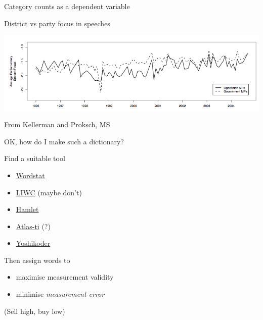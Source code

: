 \documentclass{hertieteaching}
\begin{document}
\begin{frame}{Category counts as a dependent variable}

District vs party focus in speeches

{\centering \includegraphics[width=0.9\linewidth]{pictures/district-party-focus} 

}
From Kellerman and Proksch, MS


\end{frame}

%
%
%
%

\begin{frame}{OK, how do I make such a dictionary?}

Find a suitable tool
\begin{itemize}
  \item \href{http://provalisresearch.com/products/content-analysis-software/}{Wordstat}
  \item \href{http://liwc.wpengine.com/}{LIWC} (maybe don't)
  \item \href{http://apb.newmdsx.com/hamlet2.html}{Hamlet}
  \item \href{http://atlasti.com/}{Atlas-ti} (?)
  \item \href{https://github.com/conjugateprior/yoshikoder/releases/tag/v0.6.5}{Yoshikoder}
\end{itemize}

\pause

Then assign words to
\begin{itemize}
\item
  maximise measurement validity
  \item
  minimise \emph{measurement error}
\end{itemize}

\pause

(Sell high, buy low)

\end{frame}
\end{document}
